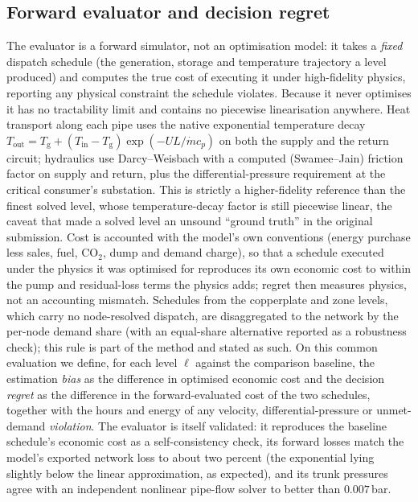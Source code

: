 \documentclass[a4paper,fleqn]{cas-sc}
\begin{document}
\subsection{Forward evaluator and decision regret}
\label{subsec:evaluator}
The evaluator is a forward simulator, not an optimisation model: it takes a \emph{fixed}
dispatch schedule (the generation, storage and temperature trajectory a level produced)
and computes the true cost of executing it under high-fidelity physics, reporting any physical
constraint the schedule violates. Because it never optimises it has no tractability limit and
contains no piecewise linearisation anywhere. Heat transport along each pipe uses the native
exponential temperature decay $T_\text{out}=T_\text{g}+(T_\text{in}-T_\text{g})\exp(-U L/\dot m
c_p)$ on both the supply and the return circuit; hydraulics use Darcy--Weisbach with a
computed (Swamee--Jain) friction factor on supply and return, plus the differential-pressure
requirement at the critical consumer's substation. This is strictly a higher-fidelity
reference than the finest solved level, whose temperature-decay factor is still piecewise
linear, the caveat that made a solved level an unsound ``ground truth'' in the original
submission. Cost is accounted with the model's own conventions (energy purchase less sales,
fuel, CO$_2$, dump and demand charge), so that a schedule executed under the physics it was
optimised for reproduces its own economic cost to within the pump and residual-loss terms
the physics adds; regret then measures physics, not an accounting mismatch. Schedules from the
copperplate and zone levels, which carry no node-resolved dispatch, are disaggregated to the
network by the per-node demand share (with an equal-share alternative reported as a
robustness check); this rule is part of the method and stated as such. On this common
evaluation we define, for each level $\ell$ against the comparison baseline, the estimation
\emph{bias} as the difference in optimised economic cost and the decision \emph{regret} as the
difference in the forward-evaluated cost of the two schedules, together with the hours and
energy of any velocity, differential-pressure or unmet-demand \emph{violation}. The evaluator
is itself validated: it reproduces the baseline schedule's economic cost as a self-consistency
check, its forward losses match the model's exported network loss to about two percent (the
exponential lying slightly below the linear approximation, as expected), and its trunk
pressures agree with an independent nonlinear pipe-flow solver to better than $0.007$\,bar.
\end{document}
